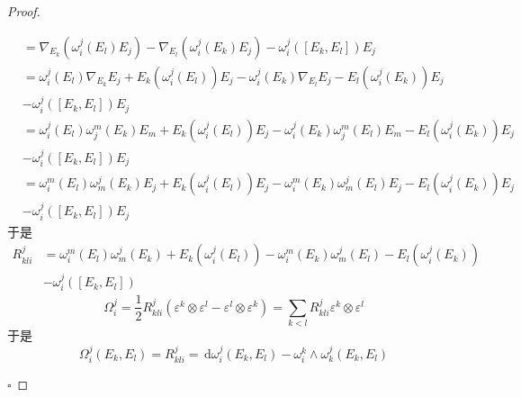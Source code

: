 \documentclass[../../main.tex]{subfiles}
\begin{document}
\begin{proof}
\begin{enumerate}
\[\begin{aligned}
   &=  \nabla _{E_{k}}\left(  \omega _{i}^{j}\left( E_{l} \right)E_{j}  \right) - \nabla _{E_{l}}\left(  \omega _{i}^{j}\left( E_{k} \right)E_{j}  \right)-  \omega _{i}^{j}\left( \left[  E_{k},E_{l}\right]  \right)E_{j}  \\ 
    &=  \omega _{i}^{j}\left( E_{l} \right) \nabla _{E_{k}}E_{j} + E_{k}\left(  \omega _{i}^{j}\left( E_{l} \right)  \right)E_{j} -  \omega _{i}^{j}\left( E_{k} \right) \nabla _{E_{l}} E_{j}- E_{l}\left(  \omega _{i}^{j}\left( E_{k} \right)  \right)E_{j}\\ 
     &- \omega _{i}^{j}\left( \left[ E_{k},E_{l} \right]  \right)E_{j}  \\ 
      &=  \omega _{i}^{j}\left( E_{l} \right) \omega _{j}^{m}\left( E_{k} \right)E_{m} + E_{k}  \left(  \omega _{i}^{j}\left( E_{l} \right)  \right)E_{j}-  \omega _{i}^{j}\left( E_{k} \right) \omega _{j}^{m}\left( E_{l} \right)E_{m}-E_{l}\left(  \omega _{i}^{j}\left( E_{k} \right)  \right)E_{j}\\ 
       &- \omega _{i}^{j}\left( \left[ E_{k},E_{l} \right]  \right)E_{j}     \\ 
        &=   \omega _{i}^{m}\left( E_{l} \right) \omega _{m}^{j}\left( E_{k} \right)E_{j}+ E_{k}\left(  \omega _{i}^{j}\left( E_{l} \right)  \right)E_{j}- \omega _{i}^{m}\left( E_{k} \right) \omega _{m}^{j}\left( E_{l} \right)E_{j} -E_{l}\left(  \omega _{i}^{j}\left( E_{k} \right)  \right)E_{j}\\ 
         &- \omega _{i}^{j}\left( \left[  E_{k},E_{l} \right]  \right)E_{j}       
  \end{aligned}
  \]于是 \[
  \begin{aligned}
  R_{kli}^{j}&=  \omega _{i}^{m}\left( E_{l} \right) \omega _{m}^{j}\left( E_{k} \right)+ E_{k}\left(  \omega _{i}^{j}\left( E_{l} \right)  \right)- \omega _{i}^{m}\left( E_{k} \right) \omega _{m}^{j}\left( E_{l} \right)-E_{l}\left(  \omega _{i}^{j}\left( E_{k} \right)  \right)\\ 
   &- \omega _{i}^{j}\left( \left[ E_{k},E_{l} \right]  \right)
  \end{aligned}
  \] 
\[
 \Omega _{i}^{j}= \frac{1}{2}R_{kli}^{j}\left(  \varepsilon ^{k}\otimes  \varepsilon ^{l}- \varepsilon ^{l}\otimes  \varepsilon ^{k} \right) = \sum _{k<l}R_{kli}^{j} \varepsilon ^{k}\otimes  \varepsilon ^{l}
\]于是 \[
 \Omega _{i}^{j}\left( E_{k},E_{l} \right)= R_{kli}^{j} = \,\mathrm{d}  \omega _{i}^{j}\left( E_{k},E_{l} \right)-  \omega _{i}^{k}\wedge  \omega _{k}^{j}\left( E_{k},E_{l} \right)  
\]

    \end{enumerate}
    

    \hfill $\square$
\end{proof}
\end{document}
